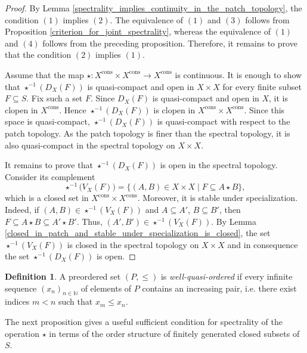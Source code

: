 \documentclass[10pt, reqno]{amsart}
\theoremstyle{plain}
\theoremstyle{definition}
\newtheorem{definition}[theorem]{Definition}
\begin{document}
\begin{proof}
    By Lemma \ref{spectrality_implies_continuity_in_the_patch_topology}, the condition $(1)$ implies $(2)$. The equivalence of $(1)$ and $(3)$ follows from Proposition \ref{criterion_for_joint_spectrality}, whereas the equivalence of $(1)$ and $(4)$ follows from the preceding proposition. Therefore, it remains to prove that the condition $(2)$ implies $(1)$.  

    Assume that the map $\star: X^\mathrm{cons}\times X^\mathrm{cons} \to X^\mathrm{cons}$ is continuous. It is enough to show that $\star^{-1}(D_X(F))$ is quasi-compact and open in $X \times X$ for every finite subset $F \subseteq S$. Fix such a set $F$. Since $D_X(F)$ is quasi-compact and open in $X$, it is clopen in $X^\mathrm{cons}$. Hence $\star^{-1}(D_X(F))$ is clopen in $X^\mathrm{cons}\times X^\mathrm{cons}$. Since this space is quasi-compact, $\star^{-1}(D_X(F))$ is quasi-compact with respect to the patch topology. As the patch topology is finer than the spectral topology, it is also quasi-compact in the spectral topology on $X \times X$. 

    It remains to prove that $\star^{-1}(D_X(F))$ is open in the spectral topology. Consider its complement $$\star^{-1}\big(V_X(F)\big) = \{(A, B)\in X \times X \mid F \subseteq A \star B\},$$ which is a closed set in $X^\mathrm{cons} \times X^\mathrm{cons}$. Moreover, it is stable under specialization. Indeed, if $(A, B) \in \star^{-1}(V_X(F))$ and $A \subseteq A'$, $B\subseteq B'$, then $F \subseteq A\star B \subseteq A'\star B'$. Thus, $(A', B')\in \star^{-1}(V_X(F))$. By Lemma \ref{closed_in_patch_and_stable_under_specialization_is_closed}, the set $\star^{-1}(V_X(F))$ is closed in the spectral topology on $X \times X$ and in consequence the set $\star^{-1}(D_X(F))$ is open. 
\end{proof}
\begin{definition}\cite[Definition 1.1]{schmitz}
    A preordered set $(P, \leqslant)$ is \emph{well-quasi-ordered} if every infinite sequence $(x_n)_{n \in\mathbb{N}}$ of elements of $P$ contains an increasing pair, i.e. there exist indices $m < n$ such that $x_m \leqslant x_n$. 
\end{definition}
The next proposition gives a useful sufficient condition for spectrality of the operation $\star$ in terms of the order structure of finitely generated closed subsets of $S$. 
\end{document}
